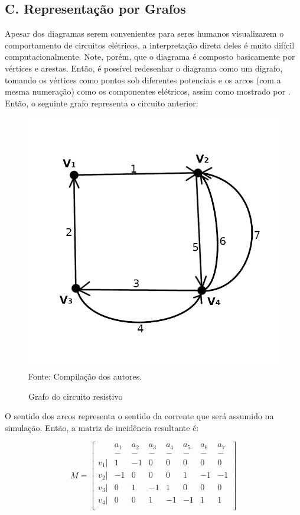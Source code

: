 \documentclass[twocolumn, 10pt]{extarticle}
\begin{document}
\subsection*{C. \quad Representação por Grafos}

Apesar dos diagramas serem convenientes para seres humanos visualizarem o comportamento de circuitos elétricos, a interpretação direta deles é muito difícil computacionalmente. Note, porém, que o diagrama é composto basicamente por vértices e arestas. Então, é possível redesenhar o diagrama como um digrafo, tomando os vértices como pontos sob diferentes potenciais e os arcos (com a mesma numeração) como os componentes elétricos, assim como mostrado por \cite[p. 838]{krishna}. Então, o seguinte grafo representa o circuito anterior:

\begin{figure}[H]
	\caption{Grafo do circuito resistivo} 
	\centering
	\includegraphics[scale=1]{grcrc1}
	\\ Fonte: Compilação dos autores.
\end{figure}

O sentido dos arcos representa o sentido da corrente que será assumido na simulação. Então, a matriz de incidência resultante é:

\[
M = 
\begin{bmatrix}
 & a_1 & a_2 & a_3 & a_4 & a_5 & a_6 & a_7 \\
 & - & - & - & - & - & - & - \\
 v_1 |& 1  & -1 & 0  & 0  & 0  & 0  & 0  \\
 v_2 |& -1 & 0  & 0  & 0  & 1  & -1 & -1 \\
 v_3 |& 0  & 1  & -1 & 1  & 0  & 0  & 0  \\
 v_4 |& 0  & 0  & 1  & -1 & -1 & 1  & 1  \\
\end{bmatrix}
\]
\end{document}
